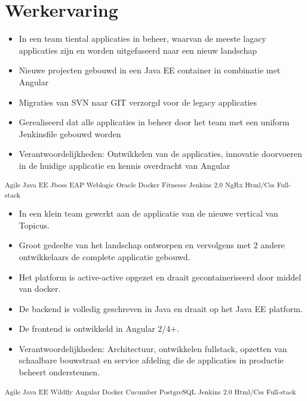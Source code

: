 \documentclass[]{deedy-resume-openfont}
\begin{document}
\begin{minipage}[t]{0.74\textwidth} 

\section{Werkervaring}

\vspace{-2mm}
\begin{itemize} \setlength\itemsep{0.1em}
\item In een team tiental applicaties in beheer, waarvan de meeste lagacy applicaties zijn en worden uitgefaseerd naar een nieuw landschap
\item Nieuwe projecten gebouwd in een Java EE container in combinatie met Angular
\item Migraties van SVN naar GIT verzorgd voor de legacy applicaties 
\item Gerealiseerd dat alle applicaties in beheer door het team met een uniform Jenkinsfile gebouwd worden
\item Verantwoordelijkheden: Ontwikkelen van de applicaties, innovatie doorvoeren in de huidige applicatie en kennis overdracht van Angular
\end{itemize}
\vspace{-4mm}
\textsubscript{Agile \textbullet{} Java EE \textbullet{} Jboss EAP \textbullet{} Weblogic \textbullet{} Oracle \textbullet{} Docker \textbullet{} Fitnesse \textbullet{} Jenkins 2.0 \textbullet{} NgRx \textbullet{} Html/Css \textbullet{} Full-stack}
\sectionsep

\vspace{-2mm}
\begin{itemize} \setlength\itemsep{0.1em}
\item In een klein team gewerkt aan de applicatie van de nieuwe vertical van Topicus. 
\item Groot gedeelte van het landschap ontworpen en vervolgens met 2 andere ontwikkelaars de complete applicatie gebouwd.
\item Het platform is active-active opgezet en draait gecontaineriseerd door middel van docker. 
\item De backend is volledig geschreven in Java en draait op het Java EE platform.
\item De frontend is ontwikkeld in Angular 2/4+. 
\item Verantwoordelijkheden: Architectuur, ontwikkelen fullstack, opzetten van schaalbare bouwstraat en service afdeling die de applicaties in productie beheert ondersteunen.
\end{itemize}
\vspace{-4mm}
\textsubscript{Agile \textbullet{} Java EE\textbullet{} Wildfly \textbullet{} Angular \textbullet{} Docker \textbullet{} Cucumber \textbullet{} PostgreSQL \textbullet{} Jenkins 2.0 \textbullet{} Html/Css \textbullet{} Full-stack}
\sectionsep


\end{minipage}
\end{document}
